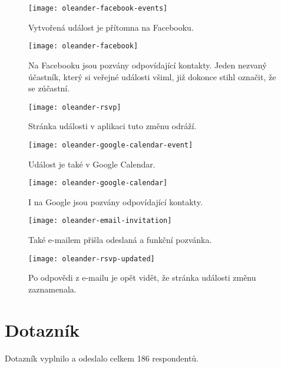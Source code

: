 \documentclass[12pt,oneside,final]{fithesis2}
\begin{document}
\begin{figure}[h]
    \centering
    \texttt{[image: oleander-facebook-events]}
    \caption{Vytvořená událost je přítomna na Facebooku.}
\end{figure}

\begin{figure}[h]
    \centering
    \texttt{[image: oleander-facebook]}
    \caption{Na Facebooku jsou pozvány odpovídající kontakty. Jeden nezvaný účastník, který si veřejné události všiml, již dokonce stihl označit, že se  zúčastní.}
\end{figure}

\begin{figure}[h]
    \centering
    \texttt{[image: oleander-rsvp]}
    \caption{Stránka události v aplikaci tuto změnu odráží.}
\end{figure}

\begin{figure}[h]
    \centering
    \texttt{[image: oleander-google-calendar-event]}
    \caption{Událost je také v Google Calendar.}
\end{figure}

\begin{figure}[h]
    \centering
    \texttt{[image: oleander-google-calendar]}
    \caption{I na Google jsou pozvány odpovídající kontakty.}
\end{figure}

\begin{figure}[h]
    \centering
    \texttt{[image: oleander-email-invitation]}
    \caption{Také e-mailem přišla odeslaná a funkční pozvánka.}
\end{figure}

\begin{figure}[h]
    \centering
    \texttt{[image: oleander-rsvp-updated]}
    \caption{Po odpovědi z e-mailu je opět vidět, že stránka události změnu zaznamenala.}
\end{figure}



\chapter{Dotazník}\label{pollAppendix}
Dotazník vyplnilo a odeslalo celkem 186 respondentů.
\end{document}
